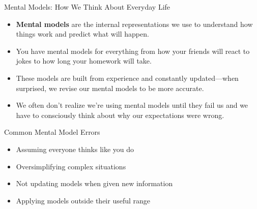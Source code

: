 \documentclass{beamer}
\begin{document}
	\begin{frame}{Mental Models: How We Think About Everyday Life}
		\begin{itemize}
			\item \textbf{Mental models} are the internal representations we use to understand how things work and predict what will happen.
			\item You have mental models for everything from how your friends will react to jokes to how long your homework will take.
			\item These models are built from experience and constantly updated—when surprised, we revise our mental models to be more accurate.
			\item We often don't realize we're using mental models until they fail us and we have to consciously think about why our expectations were wrong.
		\end{itemize}
		
		\begin{alertblock}{Common Mental Model Errors}
			\begin{itemize}
				\item Assuming everyone thinks like you do
				\item Oversimplifying complex situations
				\item Not updating models when given new information
				\item Applying models outside their useful range
			\end{itemize}
		\end{alertblock}
	\end{frame}
	
\end{document}

